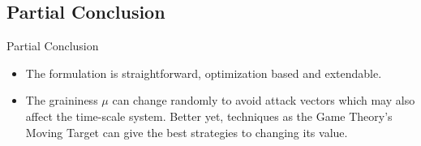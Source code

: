 
\subsection{Partial Conclusion}%
\label{subsec:ts-conclusion}

\begin{slide}{Partial Conclusion}
  \begin{itemize}
    \item The formulation is straightforward, optimization based and extendable.
    \item The graininess \(\mu\) can change randomly to avoid attack vectors
          which may also affect the time-scale system. Better yet, techniques as
          the Game Theory's Moving Target can give the best strategies to
          changing its value.
  \end{itemize}
\end{slide}
